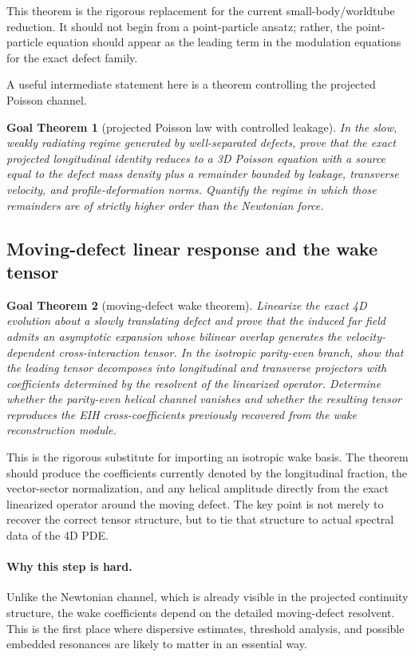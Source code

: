 \documentclass[11pt]{article}
\newtheorem{goal}{Goal Theorem}
\begin{document}
This theorem is the rigorous replacement for the current small-body/worldtube reduction. It should not begin from a point-particle ansatz; rather, the point-particle equation should appear as the leading term in the modulation equations for the exact defect family.

A useful intermediate statement here is a theorem controlling the projected Poisson channel.
\begin{goal}[projected Poisson law with controlled leakage]
In the slow, weakly radiating regime generated by well-separated defects, prove that the exact projected longitudinal identity reduces to a 3D Poisson equation with a source equal to the defect mass density plus a remainder bounded by leakage, transverse velocity, and profile-deformation norms. Quantify the regime in which those remainders are of strictly higher order than the Newtonian force.
\end{goal}

\subsection{Moving-defect linear response and the wake tensor}

\begin{goal}[moving-defect wake theorem]
Linearize the exact 4D evolution about a slowly translating defect and prove that the induced far field admits an asymptotic expansion whose bilinear overlap generates the velocity-dependent cross-interaction tensor. In the isotropic parity-even branch, show that the leading tensor decomposes into longitudinal and transverse projectors with coefficients determined by the resolvent of the linearized operator. Determine whether the parity-even helical channel vanishes and whether the resulting tensor reproduces the EIH cross-coefficients previously recovered from the wake reconstruction module.
\end{goal}

This is the rigorous substitute for importing an isotropic wake basis. The theorem should produce the coefficients currently denoted by the longitudinal fraction, the vector-sector normalization, and any helical amplitude directly from the exact linearized operator around the moving defect. The key point is not merely to recover the correct tensor structure, but to tie that structure to actual spectral data of the 4D PDE.

\paragraph{Why this step is hard.}
Unlike the Newtonian channel, which is already visible in the projected continuity structure, the wake coefficients depend on the detailed moving-defect resolvent. This is the first place where dispersive estimates, threshold analysis, and possible embedded resonances are likely to matter in an essential way.
\end{document}
